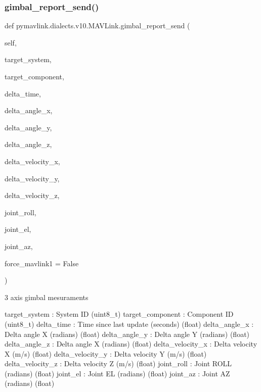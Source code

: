 \begin{DoxyVerb}
\begin{DoxyVerb}
\subsubsection{\texorpdfstring{gimbal\+\_\+report\+\_\+send()}{gimbal\_report\_send()}}
{\footnotesize\ttfamily def pymavlink.\+dialects.\+v10.\+M\+A\+V\+Link.\+gimbal\+\_\+report\+\_\+send (\begin{DoxyParamCaption}\item[{}]{self,  }\item[{}]{target\+\_\+system,  }\item[{}]{target\+\_\+component,  }\item[{}]{delta\+\_\+time,  }\item[{}]{delta\+\_\+angle\+\_\+x,  }\item[{}]{delta\+\_\+angle\+\_\+y,  }\item[{}]{delta\+\_\+angle\+\_\+z,  }\item[{}]{delta\+\_\+velocity\+\_\+x,  }\item[{}]{delta\+\_\+velocity\+\_\+y,  }\item[{}]{delta\+\_\+velocity\+\_\+z,  }\item[{}]{joint\+\_\+roll,  }\item[{}]{joint\+\_\+el,  }\item[{}]{joint\+\_\+az,  }\item[{}]{force\+\_\+mavlink1 = {\ttfamily False} }\end{DoxyParamCaption})}

\begin{DoxyVerb}3 axis gimbal mesuraments

target_system             : System ID (uint8_t)
target_component          : Component ID (uint8_t)
delta_time                : Time since last update (seconds) (float)
delta_angle_x             : Delta angle X (radians) (float)
delta_angle_y             : Delta angle Y (radians) (float)
delta_angle_z             : Delta angle X (radians) (float)
delta_velocity_x          : Delta velocity X (m/s) (float)
delta_velocity_y          : Delta velocity Y (m/s) (float)
delta_velocity_z          : Delta velocity Z (m/s) (float)
joint_roll                : Joint ROLL (radians) (float)
joint_el                  : Joint EL (radians) (float)
joint_az                  : Joint AZ (radians) (float)\end{DoxyVerb}
 \mbox{\label{classpymavlink_1_1dialects_1_1v10_1_1MAVLink_a11c690643a3ce97e315390a666035d93}} 

\end{DoxyVerb}
\end{DoxyVerb}
